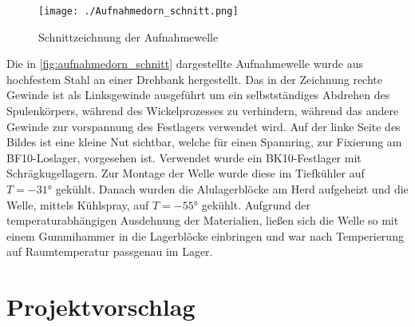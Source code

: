 

\begin{figure}[H]
    \centering
    \texttt{[image: ./Aufnahmedorn\_schnitt.png]}
    \caption{Schnittzeichnung der Aufnahmewelle}
    \label{fig:aufnahmedorn_schnitt}
\end{figure}

Die in \autoref{fig:aufnahmedorn_schnitt} dargestellte Aufnahmewelle wurde aus hochfestem Stahl an einer Drehbank hergestellt. Das in der Zeichnung rechte Gewinde ist als Linksgewinde ausgeführt um ein selbstständiges Abdrehen des Spulenkörpers, während des Wickelprozesses zu verhindern, während das andere Gewinde zur vorspannung des Festlagers verwendet wird. Auf der linke Seite des Bildes ist eine kleine Nut sichtbar, welche für einen Spannring, zur Fixierung am BF10-Loslager, vorgesehen ist. Verwendet wurde ein BK10-Festlager mit Schrägkugellagern. Zur Montage der Welle wurde diese im Tiefkühler auf $T = -31\si{\degree}$ gekühlt. Danach wurden die Alulagerblöcke am Herd aufgeheizt und die Welle, mittels Kühlspray, auf $T = -55\si{\degree}$ gekühlt. Aufgrund der temperaturabhängigen Ausdehnung der Materialien, ließen sich die Welle so mit einem Gummihammer in die Lagerblöcke einbringen und war nach Temperierung auf Raumtemperatur passgenau im Lager.

\section{Projektvorschlag}
\label{appx:projektvorschlag}

